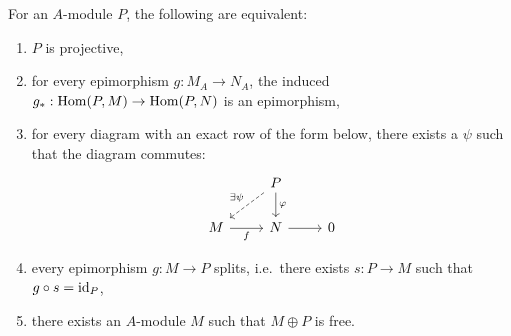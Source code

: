 \begin{theorem}
  For an $A$-module $P$, the following are equivalent:
  \begin{enumerate}
  \item $P$ is projective,
  \item for every epimorphism $g: M_A \to N_A$, the induced $g_*: \operatorname{Hom}(P, M) \to
	\operatorname{Hom}(P, N)$ is an epimorphism,
  \item for every diagram with an exact row of the form below, there exists a
	$\psi$ such that the diagram commutes:
	\[\begin{tikzcd}
		& P \\
		M & N & 0
		\arrow["{\exists \psi}"', dashed, from=1-2, to=2-1]
		\arrow["\varphi", from=1-2, to=2-2]
		\arrow["f"', from=2-1, to=2-2]
		\arrow[from=2-2, to=2-3]
	  \end{tikzcd}\]
  \item every epimorphism $g: M \to P$ splits, i.e.~there exists $s: P \to M$
	such that $g \circ s = \operatorname{id}_P$,
  \item there exists an $A$-module $M$ such that $M \oplus P$ is free.
  \end{enumerate}
\end{theorem}

